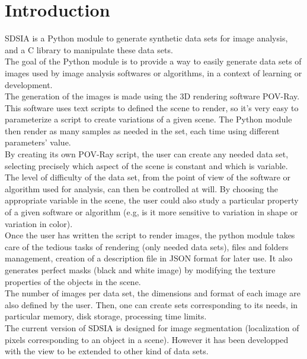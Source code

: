 \section*{Introduction}

SDSIA is a Python module to generate synthetic data sets for image analysis, and a C library to manipulate these data sets.\\

The goal of the Python module is to provide a way to easily generate data sets of images used by image analysis softwares or algorithms, in a context of learning or development.\\

The generation of the images is made using the 3D rendering software POV-Ray. This software uses text scripts to defined the scene to render, so it's very easy to parameterize a script to create variations of a given scene. The Python module then render as many samples as needed in the set, each time using different parameters' value.\\

By creating its own POV-Ray script, the user can create any needed data set, selecting precisely which aspect of the scene is constant and which is variable. The level of difficulty of the data set, from the point of view of the software or algorithm used for analysis, can then be controlled at will. By choosing the appropriate variable in the scene, the user could also study a particular property of a given software or algorithm (e.g, is it more sensitive to variation in shape or variation in color).\\

Once the user has written the script to render images, the python module takes care of the tedious tasks of rendering (only needed data sets), files and folders management, creation of a description file in JSON format for later use. It also generates perfect masks (black and white image) by modifying the texture properties of the objects in the scene.\\

The number of images per data set, the dimensions and format of each image are also defined by the user. Then, one can create sets corresponding to its needs, in particular memory, disk storage, processing time limits.\\

The current version of SDSIA is designed for image segmentation (localization of pixels corresponding to an object in a scene). However it has been developped with the view to be extended to other kind of data sets.\\

